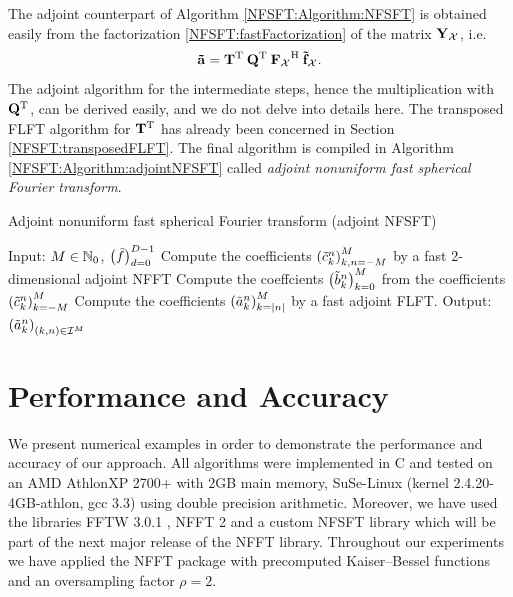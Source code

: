 The adjoint counterpart of Algorithm \ref{NFSFT:Algorithm:NFSFT} is obtained easily from the factorization 
\eqref{NFSFT:fastFactorization} of the matrix $\mathbf{Y}_{\mathcal{X}}$, i.e.
\[
  \mathbf{\tilde{a}} = \mathbf{T}^{\text{\rm{T}}} \: \mathbf{Q}^{\text{\rm{T}}} \: {\mathbf{F}_{\mathcal{X}}}^{\text{\rm{H}}} \: \mathbf{\tilde{f}}_{\mathcal{X}}.
\]
The adjoint algorithm for the intermediate steps, hence the multiplication with $\mathbf{Q}^{\text{\rm{T}}}$, can be derived easily, 
and we do not delve into details here. The transposed FLFT algorithm for $\mathbf{T}^{\text{\rm{T}}}$ has already been concerned 
in Section \ref{NFSFT:transposedFLFT}. The final algorithm is compiled in Algorithm \ref{NFSFT:Algorithm:adjointNFSFT} 
called \emph{adjoint nonuniform fast spherical Fourier transform}.

\begin{algorithm}[tb]
  \caption{Adjoint nonuniform fast spherical Fourier transform (adjoint NFSFT)}
  \label{NFSFT:Algorithm:adjointNFSFT}    
  \begin{algorithmic}
    \STATE Input:  $M \in \mathbb{N}_{0}$, $\left(\tilde{f}\right)_{d=0}^{D-1}$
    \STATE Compute the coefficients $\left(\tilde{c}_{k}^n\right)_{k,n=-M}^M$ by a fast 2-dimensional adjoint NFFT
      \STATE Compute the coeffcients $\left(\tilde{b}_{k}^n\right)_{k=0}^M$ from the coefficients $\left(\tilde{c}_{k}^n\right)_{k=-M}^{M}$ 
      \STATE Compute the coefficients $\left(\tilde{a}_{k}^n\right)_{k=|n|}^{M}$ by a fast adjoint FLFT.
    \ENDFOR
    \STATE Output: $\left(\tilde{a}_{k}^n\right)_{(k,n) \in \mathcal{I}^M}$
\end{algorithmic}
\end{algorithm}

\section{Performance and Accuracy}
We present numerical examples in order to demonstrate the performance and accuracy of our approach. All algorithms were implemented in C and tested on an 
AMD Athlon\texttrademark XP 2700+ with 2GB main memory, SuSe-Linux 
(kernel 2.4.20-4GB-athlon, gcc 3.3) using double precision arithmetic. 
Moreover, we have used the libraries FFTW 3.0.1 \cite{fftw}, NFFT 2
\cite{kupo02C} and a custom NFSFT library which will be part of the next 
major release of the NFFT library. Throughout our experiments we have 
applied the NFFT package \cite{kupo02C} with precomputed Kaiser--Bessel 
functions and an oversampling factor $\rho=2$.

